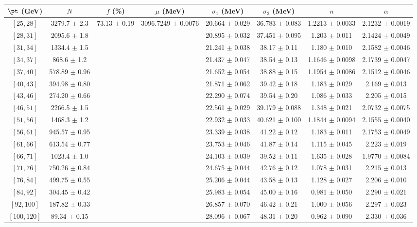 \begin{tabular}{c||c|c|c|c|c|c|c}
$\pt$ (GeV) & $N$ & $f$ (\%) & $\mu$ (MeV) & $\sigma_1$ (MeV) & $\sigma_2$ (MeV) & $n$ & $\alpha$ \\
\hline
$[25, 28]$ & 3279.7 $\pm$ 2.3 & \multirow{17}{*}{73.13 $\pm$ 0.19} & \multirow{17}{*}{3096.7249 $\pm$ 0.0076} & 20.664 $\pm$ 0.029 & 36.783 $\pm$ 0.083 & 1.2213 $\pm$ 0.0033 & 2.1232 $\pm$ 0.0019\\
$[28, 31]$ & 2095.6 $\pm$ 1.8 &  &  & 20.895 $\pm$ 0.032 & 37.451 $\pm$ 0.095 & 1.203 $\pm$ 0.011 & 2.1424 $\pm$ 0.0049\\
$[31, 34]$ & 1334.4 $\pm$ 1.5 &  &  & 21.241 $\pm$ 0.038 & 38.17 $\pm$ 0.11 & 1.180 $\pm$ 0.010 & 2.1582 $\pm$ 0.0046\\
$[34, 37]$ & 868.6 $\pm$ 1.2 &  &  & 21.437 $\pm$ 0.047 & 38.54 $\pm$ 0.13 & 1.1646 $\pm$ 0.0098 & 2.1739 $\pm$ 0.0047\\
$[37, 40]$ & 578.89 $\pm$ 0.96 &  &  & 21.652 $\pm$ 0.054 & 38.88 $\pm$ 0.15 & 1.1954 $\pm$ 0.0086 & 2.1512 $\pm$ 0.0046\\
$[40, 43]$ & 394.98 $\pm$ 0.80 &  &  & 21.871 $\pm$ 0.062 & 39.42 $\pm$ 0.18 & 1.183 $\pm$ 0.029 & 2.169 $\pm$ 0.013\\
$[43, 46]$ & 274.20 $\pm$ 0.66 &  &  & 22.290 $\pm$ 0.074 & 39.54 $\pm$ 0.20 & 1.086 $\pm$ 0.033 & 2.205 $\pm$ 0.015\\
$[46, 51]$ & 2266.5 $\pm$ 1.5 &  &  & 22.561 $\pm$ 0.029 & 39.179 $\pm$ 0.088 & 1.348 $\pm$ 0.021 & 2.0732 $\pm$ 0.0075\\
$[51, 56]$ & 1468.3 $\pm$ 1.2 &  &  & 22.932 $\pm$ 0.033 & 40.621 $\pm$ 0.100 & 1.1844 $\pm$ 0.0094 & 2.1555 $\pm$ 0.0040\\
$[56, 61]$ & 945.57 $\pm$ 0.95 &  &  & 23.339 $\pm$ 0.038 & 41.22 $\pm$ 0.12 & 1.183 $\pm$ 0.011 & 2.1753 $\pm$ 0.0049\\
$[61, 66]$ & 613.54 $\pm$ 0.77 &  &  & 23.753 $\pm$ 0.046 & 41.87 $\pm$ 0.14 & 1.115 $\pm$ 0.045 & 2.223 $\pm$ 0.019\\
$[66, 71]$ & 1023.4 $\pm$ 1.0 &  &  & 24.103 $\pm$ 0.039 & 39.52 $\pm$ 0.11 & 1.635 $\pm$ 0.028 & 1.9770 $\pm$ 0.0084\\
$[71, 76]$ & 750.26 $\pm$ 0.84 &  &  & 24.675 $\pm$ 0.044 & 42.76 $\pm$ 0.12 & 1.078 $\pm$ 0.031 & 2.215 $\pm$ 0.013\\
$[76, 84]$ & 499.75 $\pm$ 0.55 &  &  & 25.206 $\pm$ 0.044 & 43.58 $\pm$ 0.13 & 1.128 $\pm$ 0.027 & 2.206 $\pm$ 0.010\\
$[84, 92]$ & 304.45 $\pm$ 0.42 &  &  & 25.983 $\pm$ 0.054 & 45.00 $\pm$ 0.16 & 0.981 $\pm$ 0.050 & 2.290 $\pm$ 0.021\\
$[92, 100]$ & 187.82 $\pm$ 0.33 &  &  & 26.857 $\pm$ 0.070 & 46.42 $\pm$ 0.21 & 1.000 $\pm$ 0.056 & 2.297 $\pm$ 0.023\\
$[100, 120]$ & 89.34 $\pm$ 0.15 &  &  & 28.096 $\pm$ 0.067 & 48.31 $\pm$ 0.20 & 0.962 $\pm$ 0.090 & 2.330 $\pm$ 0.036\\
\end{tabular}
